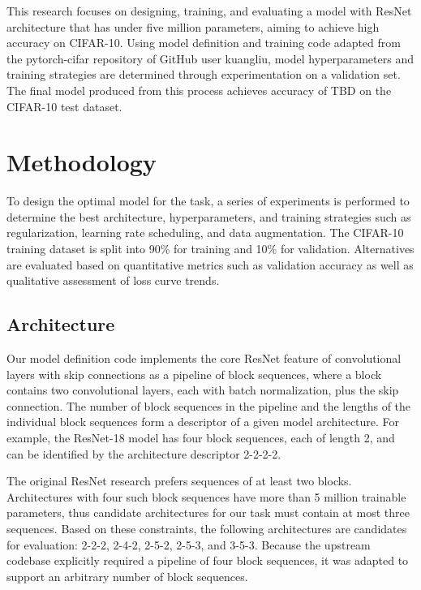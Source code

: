 \documentclass[letterpaper]{article} %
\begin{document}
This research focuses on designing, training, and evaluating a model with ResNet architecture that has under five
million parameters, aiming to achieve high accuracy on CIFAR-10.
Using model definition and training code adapted from the pytorch-cifar repository of GitHub user kuangliu, model
hyperparameters and training strategies are determined through experimentation on a validation set.
The final model produced from this process achieves accuracy of TBD on the CIFAR-10 test dataset.

\section{Methodology}

To design the optimal model for the task, a series of experiments is performed to determine the best architecture,
hyperparameters, and training strategies such as regularization, learning rate scheduling, and data augmentation.
The CIFAR-10 training dataset is split into 90\% for training and 10\% for validation.
Alternatives are evaluated based on quantitative metrics such as validation accuracy as well as qualitative assessment
of loss curve trends.

\subsection{Architecture}

Our model definition code implements the core ResNet feature of convolutional layers with skip connections as a
pipeline of block sequences, where a block contains two convolutional layers, each with batch normalization, plus the
skip connection.
The number of block sequences in the pipeline and the lengths of the individual block sequences form a descriptor of a
given model architecture.
For example, the ResNet-18 model has four block sequences, each of length 2, and can be identified by the architecture
descriptor 2-2-2-2.

The original ResNet research prefers sequences of at least two blocks.
Architectures with four such block sequences have more than 5 million trainable parameters, thus candidate
architectures for our task must contain at most three sequences.
Based on these constraints, the following architectures are candidates for evaluation: 2-2-2, 2-4-2, 2-5-2, 2-5-3,
and 3-5-3.
Because the upstream codebase explicitly required a pipeline of four block sequences, it was adapted to support an
arbitrary number of block sequences.
\end{document}
